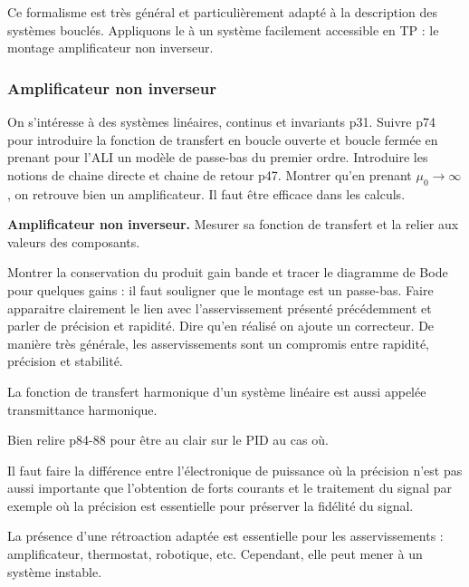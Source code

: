 \begin{transition}
Ce formalisme est très général et particulièrement adapté à la description des systèmes bouclés.
Appliquons le à un système facilement accessible en TP : le montage amplificateur non inverseur.
\end{transition}

\subsubsection{Amplificateur non inverseur}

On s'intéresse à des systèmes linéaires, continus et invariants \cite{Cardini2017} p31.
Suivre \cite{Neveu2019a} p74 pour introduire la fonction de transfert en boucle ouverte et boucle fermée en prenant pour l'ALI un modèle de passe-bas du premier ordre.
Introduire les notions de chaine directe et chaine de retour \cite{Cardini2017} p47.
Montrer qu'en prenant $\mu_0 \rightarrow \infty$, on retrouve bien un amplificateur.
Il faut être efficace dans les calculs.

\begin{experience}
\textbf{Amplificateur non inverseur.}
Mesurer sa fonction de transfert et la relier aux valeurs des composants.
\end{experience}

Montrer la conservation du produit gain bande et tracer le diagramme de Bode pour quelques gains : il faut souligner que le montage est un passe-bas.
Faire apparaitre clairement le lien avec l'asservissement présenté précédemment et parler de précision et rapidité.
Dire qu'en réalisé on ajoute un correcteur.
De manière très générale, les asservissements sont un compromis entre rapidité, précision et stabilité.

\begin{remarque}
La fonction de transfert harmonique d'un système linéaire est aussi appelée transmittance harmonique.

\noindent
Bien relire \cite{Neveu2019a} p84-88 pour être au clair sur le PID au cas où.

\noindent
Il faut faire la différence entre l'électronique de puissance où la précision n'est pas aussi importante que l'obtention de forts courants et le traitement du signal par exemple où la précision est essentielle pour préserver la fidélité du signal. 
\end{remarque}

\begin{transition}
La présence d'une rétroaction adaptée est essentielle pour les asservissements : amplificateur, thermostat, robotique, etc.
Cependant, elle peut mener à un système instable.
\end{transition}

